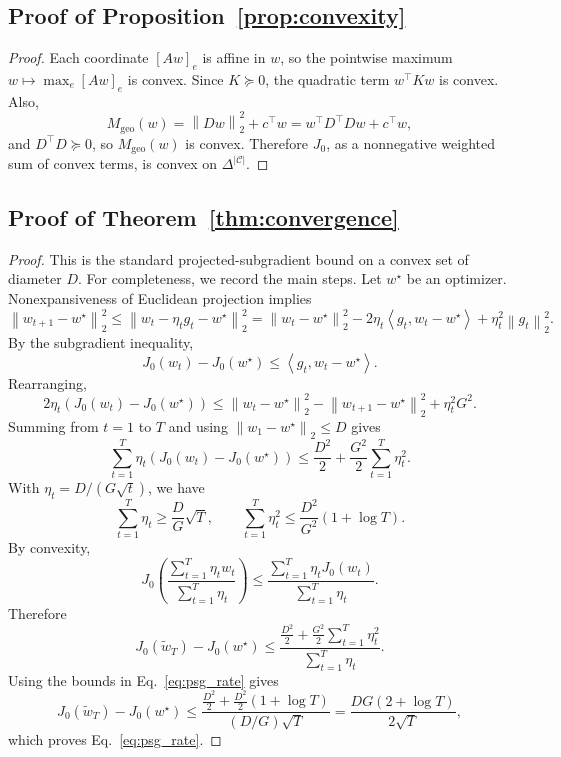 \documentclass{article}
\theoremstyle{definition}
\newcommand{\cC}{\mathcal{C}}
\newcommand{\simplex}{\Delta}
\newcommand{\norm}[1]{\left\lVert #1 \right\rVert}
\newcommand{\inner}[2]{\left\langle #1, #2 \right\rangle}
\newcommand{\paren}[1]{\left( #1 \right)}
\begin{document}
\subsection{Proof of Proposition~\ref{prop:convexity}}

\begin{proof}
Each coordinate \([Aw]_e\) is affine in \(w\), so the pointwise maximum \(w\mapsto \max_e [Aw]_e\) is convex. Since \(K\succeq 0\), the quadratic term \(w^\top K w\) is convex. Also,
\[
M_{\mathrm{geo}}(w)=\norm{Dw}_2^2+c^\top w = w^\top D^\top D w + c^\top w,
\]
and \(D^\top D \succeq 0\), so \(M_{\mathrm{geo}}(w)\) is convex. Therefore \(J_0\), as a nonnegative weighted sum of convex terms, is convex on \(\simplex^{|\cC|}\).
\end{proof}

\subsection{Proof of Theorem~\ref{thm:convergence}}

\begin{proof}
This is the standard projected-subgradient bound on a convex set of diameter \(D\). For completeness, we record the main steps. Let \(w^\star\) be an optimizer. Nonexpansiveness of Euclidean projection implies
\[
\norm{w_{t+1}-w^\star}_2^2
\le
\norm{w_t-\eta_t g_t-w^\star}_2^2
=
\norm{w_t-w^\star}_2^2
-2\eta_t \inner{g_t}{w_t-w^\star}
+ \eta_t^2 \norm{g_t}_2^2.
\]
By the subgradient inequality,
\[
J_0(w_t)-J_0(w^\star)\le \inner{g_t}{w_t-w^\star}.
\]
Rearranging,
\[
2\eta_t \paren{J_0(w_t)-J_0(w^\star)}
\le
\norm{w_t-w^\star}_2^2
-\norm{w_{t+1}-w^\star}_2^2
+\eta_t^2 G^2.
\]
Summing from \(t=1\) to \(T\) and using \(\norm{w_1-w^\star}_2\le D\) gives
\[
\sum_{t=1}^{T} \eta_t \paren{J_0(w_t)-J_0(w^\star)}
\le
\frac{D^2}{2}
+ \frac{G^2}{2}\sum_{t=1}^{T}\eta_t^2.
\]
With \(\eta_t=D/(G\sqrt t)\), we have
\[
\sum_{t=1}^{T}\eta_t \ge \frac{D}{G}\sqrt T,
\qquad
\sum_{t=1}^{T}\eta_t^2 \le \frac{D^2}{G^2}(1+\log T).
\]
By convexity,
\[
J_0\!\paren{\frac{\sum_{t=1}^{T}\eta_t w_t}{\sum_{t=1}^{T}\eta_t}}
\le
\frac{\sum_{t=1}^{T}\eta_t J_0(w_t)}{\sum_{t=1}^{T}\eta_t}.
\]
Therefore
\[
J_0(\tilde w_T)-J_0(w^\star)
\le
\frac{\frac{D^2}{2}+\frac{G^2}{2}\sum_{t=1}^{T}\eta_t^2}{\sum_{t=1}^{T}\eta_t}.
\]
Using the bounds in Eq.~\eqref{eq:psg_rate} gives
\[
J_0(\tilde w_T)-J_0(w^\star)
\le
\frac{\frac{D^2}{2}+\frac{D^2}{2}(1+\log T)}{(D/G)\sqrt{T}}
=
\frac{DG(2+\log T)}{2\sqrt{T}},
\]
which proves Eq.~\eqref{eq:psg_rate}.
\end{proof}
\end{document}
